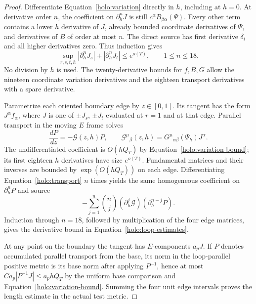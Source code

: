 \begin{proof}
Differentiate Equation~\eqref{holo:variation} directly in $h$,
including at $h=0$.  At derivative order $n$, the coefficient on
$\partial_h^nJ$ is still $c^\alpha B_{\beta\alpha}(\Psi)$.
Every other term contains a lower $h$ derivative of $J$, already
bounded coordinate derivatives of $\Psi$, and derivatives of $B$
of order at most $n$.  The direct source has first derivative
$\delta_i$ and all higher derivatives zero.  Thus induction gives
\[
 \sup_{r,s,t,h}|\partial_h^nJ_s|
     +|\partial_h^nJ_t|\leq e^{o(T)},\qquad 1\leq n\leq18.
\]
No division by $h$ is used.  The twenty-derivative bounds for
$f,B,G$ allow the nineteen coordinate variation derivatives and
the eighteen transport derivatives with a spare derivative.

Parametrize each oriented boundary edge by $z\in[0,1]$.
Its tangent has the form $J^\alpha f_\alpha$, where $J$ is one
of $\pm J_s$, $\pm J_t$ evaluated at $r=1$ and at that edge.
Parallel transport in the moving $E$ frame solves
\begin{equation}\label{holo:transport}
 \frac{dP}{dz}=-\mathcal G(z,h)P,\qquad
 \mathcal G^\mu{}_{\beta}(z,h)
          =G^\mu{}_{\alpha\beta}(\Psi_h)J^\alpha.
\end{equation}
The undifferentiated coefficient is $O(hQ_T)$ by
Equation~\eqref{holo:variation-bound}; its first eighteen
$h$ derivatives have size $e^{o(T)}$.  Fundamental matrices and
their inverses are bounded by $\exp(O(hQ_T))$ on each edge.
Differentiating Equation~\eqref{holo:transport} $n$ times yields
the same homogeneous coefficient on $\partial_h^nP$ and source
\[
 -\sum_{j=1}^n\binom nj
          (\partial_h^j\mathcal G)(\partial_h^{n-j}P).
\]
Induction through $n=18$, followed by multiplication of the four
edge matrices, gives the derivative bound in
Equation~\eqref{holo:loop-estimates}.

At any point on the boundary the tangent has $E$-components
$a_pJ$.  If $P$ denotes accumulated parallel transport from the
base, its norm in the loop-parallel positive metric is its base
norm after applying $P^{-1}$, hence at most
$C a_p|P^{-1}J|\leq a_phQ_T$ by the uniform base comparison and
Equation~\eqref{holo:variation-bound}.  Summing the four unit edge
intervals proves the length estimate in the actual test metric.


\end{proof}
